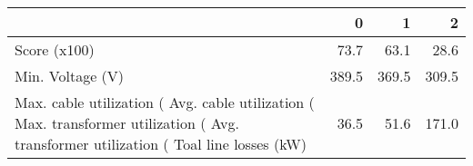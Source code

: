 \begin{tabular}{lrrr}
\toprule
 & 0 & 1 & 2 \\
\midrule
Score (x100) & 73.7 & 63.1 & 28.6 \\
Min. Voltage (V) & 389.5 & 369.5 & 309.5 \\
Max. cable utilization (%
Avg. cable utilization (%
Max. transformer utilization (%
Avg. transformer utilization (%
Toal line losses (kW) & 36.5 & 51.6 & 171.0 \\
\bottomrule
\end{tabular}
